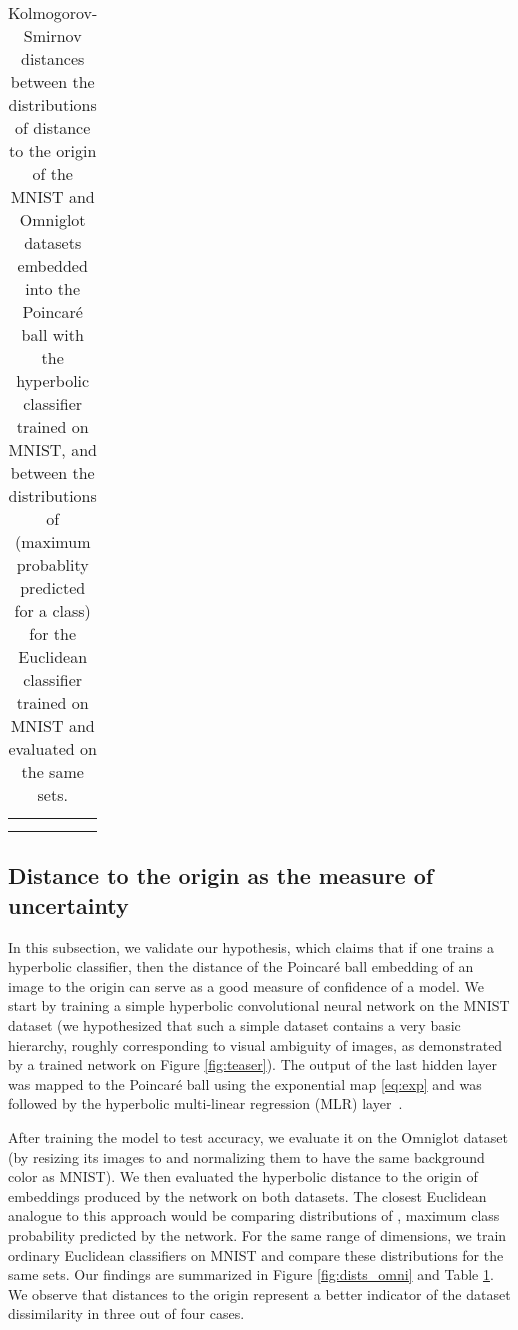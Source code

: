 \documentclass[10pt,twocolumn,letterpaper]{article}
\begin{document}
\begin{table}[htb!]
\caption{Kolmogorov-Smirnov distances between the distributions of distance to the origin of the MNIST and Omniglot datasets embedded into the Poincar\'e ball with the hyperbolic classifier trained on MNIST, and between the distributions of  (maximum probablity predicted for a class) for the Euclidean classifier trained on MNIST and evaluated on the same sets.}
\label{tab:ks_omni}
\vspace{-5mm}
\begin{center}
  \begin{tabular}{lcccc}
    \toprule
  {} &  {} & {} & {} & {}\\
    \midrule
     &  &  &  & \\
     &  &  &  & \\
    
    \bottomrule
  \end{tabular}
\end{center}
\vspace{-7mm}
\end{table} 
\subsection{Distance to the origin as the measure of uncertainty}\label{subsec:distances}
In this subsection, we validate our hypothesis, which claims that if one trains a hyperbolic classifier, then the distance of the Poincar\'e ball embedding of an image to the origin can serve as a good measure of confidence of a model. We start by training a simple hyperbolic convolutional neural network on the MNIST dataset (we hypothesized that such a simple dataset contains a very basic hierarchy, roughly corresponding to visual ambiguity of images, as demonstrated by a trained network on Figure \ref{fig:teaser}). The output of the last hidden layer was mapped to the Poincar\'e ball using the exponential map \eqref{eq:exp} and was followed by the hyperbolic multi-linear regression (MLR) layer~\cite{ganea2018hyperbolic}.

After training the model to  test accuracy, we evaluate it on the Omniglot dataset (by resizing its images to  and normalizing them to have the same background color as MNIST). We then evaluated the hyperbolic distance to the origin of embeddings produced by the network on both datasets. The closest Euclidean analogue to this approach would be comparing distributions of , maximum class probability predicted by the network. For the same range of dimensions, we train ordinary Euclidean classifiers on MNIST and compare these distributions for the same sets.
Our findings are summarized in Figure \ref{fig:dists_omni} and Table \ref{tab:ks_omni}. We observe that distances to the origin represent a better indicator of the dataset dissimilarity in three out of four cases.
\end{document}
